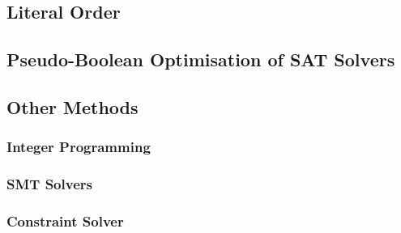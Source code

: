 

\subsection{Literal Order}


\subsection{Pseudo-Boolean Optimisation of SAT Solvers}



\subsection{Other Methods}
\subsubsection{Integer Programming}
\subsubsection{SMT Solvers}
\subsubsection{Constraint Solver}

